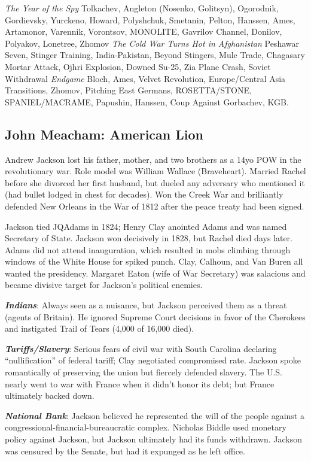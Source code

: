 \documentclass[
]{article}
\begin{document}
\emph{The Year of the Spy} Tolkachev, Angleton (Nosenko, Golitsyn),
Ogorodnik, Gordievsky, Yurckeno, Howard, Polyshchuk, Smetanin, Pelton,
Hanssen, Ames, Artamonor, Varennik, Vorontsov, MONOLITE, Gavrilov
Channel, Donilov, Polyakov, Lonetree, Zhomov \emph{The Cold War Turns
Hot in Afghanistan} Peshawar Seven, Stinger Training, India-Pakistan,
Beyond Stingers, Mule Trade, Chagasary Mortar Attack, Ojhri Explosion,
Downed Su-25, Zia Plane Crash, Soviet Withdrawal \emph{Endgame} Bloch,
Ames, Velvet Revolution, Europe/Central Asia Transitions, Zhomov,
Pitching East Germans, ROSETTA/STONE, SPANIEL/MACRAME, Papushin,
Hanssen, Coup Against Gorbachev, KGB.

\hypertarget{john-meacham-american-lion}{%
\subsection{John Meacham: American
Lion}\label{john-meacham-american-lion}}

Andrew Jackson lost his father, mother, and two brothers as a 14yo POW
in the revolutionary war. Role model was William Wallace (Braveheart).
Married Rachel before she divorced her first husband, but dueled any
adversary who mentioned it (had bullet lodged in chest for decades). Won
the Creek War and brilliantly defended New Orleans in the War of 1812
after the peace treaty had been signed.

Jackson tied JQAdams in 1824; Henry Clay anointed Adams and was named
Secretary of State. Jackson won decisively in 1828, but Rachel died days
later. Adams did not attend inauguration, which resulted in mobs
climbing through windows of the White House for spiked punch. Clay,
Calhoun, and Van Buren all wanted the presidency. Margaret Eaton (wife
of War Secretary) was salacious and became divisive target for Jackson's
political enemies.

\textbf{\emph{Indians}}: Always seen as a nuisance, but Jackson
perceived them as a threat (agents of Britain). He ignored Supreme Court
decisions in favor of the Cherokees and instigated Trail of Tears (4,000
of 16,000 died).

\textbf{\emph{Tariffs/Slavery}}: Serious fears of civil war with South
Carolina declaring ``nullification'' of federal tariff; Clay negotiated
compromised rate. Jackson spoke romantically of preserving the union but
fiercely defended slavery. The U.S. nearly went to war with France when
it didn't honor its debt; but France ultimately backed down.

\textbf{\emph{National Bank}}: Jackson believed he represented the will
of the people against a congressional-financial-bureaucratic complex.
Nicholas Biddle used monetary policy against Jackson, but Jackson
ultimately had its funds withdrawn. Jackson was censured by the Senate,
but had it expunged as he left office.
\end{document}
